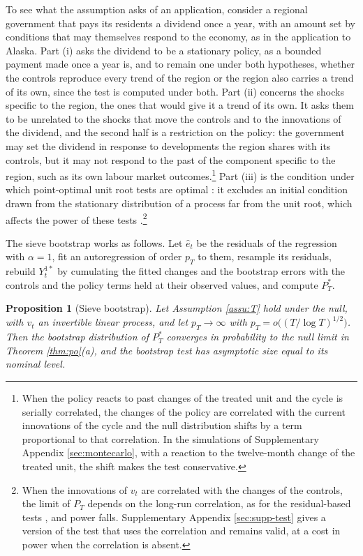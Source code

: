 \documentclass[12pt,a4paper]{article}
\newtheorem{prop}{Proposition}
\theoremstyle{definition}
\begin{document}
To see what the assumption asks of an application, consider a regional government that pays its residents a dividend once a year, with an amount set by conditions that may themselves respond to the economy, as in the application to Alaska. Part (i) asks the dividend to be a stationary policy, as a bounded payment made once a year is, and to remain one under both hypotheses, whether the controls reproduce every trend of the region or the region also carries a trend of its own, since the test is computed under both. Part (ii) concerns the shocks specific to the region, the ones that would give it a trend of its own. It asks them to be unrelated to the shocks that move the controls and to the innovations of the dividend, and the second half is a restriction on the policy: the government may set the dividend in response to developments the region shares with its controls, but it may not respond to the past of the component specific to the region, such as its own labour market outcomes.\footnote{When the policy reacts to past changes of the treated unit and the cycle is serially correlated, the changes of the policy are correlated with the current innovations of the cycle and the null distribution shifts by a term proportional to that correlation. In the simulations of Supplementary Appendix \ref{sec:montecarlo}, with a reaction to the twelve-month change of the treated unit, the shift makes the test conservative.} Part (iii) is the condition under which point-optimal unit root tests are optimal \citep{ERS1996}: it excludes an initial condition drawn from the stationary distribution of a process far from the unit root, which affects the power of these tests \citep{MullerElliott2003}.\footnote{When the innovations of $v_t$ are correlated with the changes of the controls, the limit of $P_T$ depends on the long-run correlation, as for the residual-based tests \citep{Pesavento2004}, and power falls. Supplementary Appendix \ref{sec:supp-test} gives a version of the test that uses the correlation and remains valid, at a cost in power when the correlation is absent.}

The sieve bootstrap works as follows. Let $\hat e_t$ be the residuals of the regression with $\alpha=1$, fit an autoregression of order $p_T$ to them, resample its residuals, rebuild $Y^{1\ast}_t$ by cumulating the fitted changes and the bootstrap errors with the controls and the policy terms held at their observed values, and compute $P^\ast_T$.

\begin{prop}[Sieve bootstrap\label{prop:sieve}]
Let Assumption \ref{assu:T} hold under the null, with $v_t$ an invertible linear process, and let $p_T\to\infty$ with $p_T=o\big((T/\log T)^{1/2}\big)$. Then the bootstrap distribution of $P^\ast_T$ converges in probability to the null limit in Theorem \ref{thm:po}(a), and the bootstrap test has asymptotic size equal to its nominal level.
\end{prop}
\end{document}
